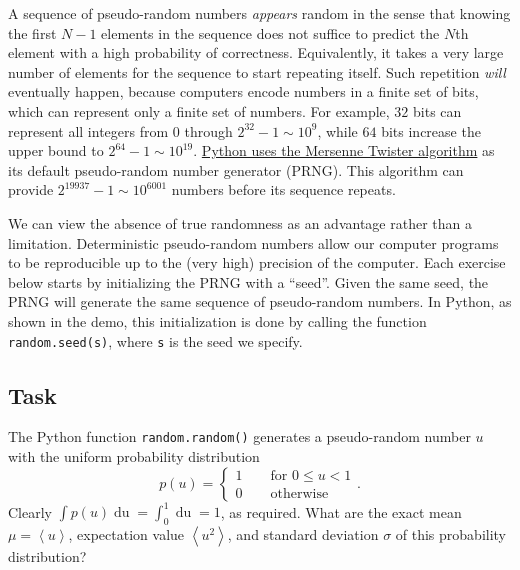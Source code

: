 \documentclass[12 pt]{article} %
\newcommand{\si}{\ensuremath{\sigma} }
\renewcommand{\d}[1]{\ensuremath{\mathop{d#1}} }
\newcommand{\vev}[1]{\ensuremath{\left\langle #1 \right\rangle} }
\newcommand{\showmarks}[1]{\rightline{\texttt{[#1 marks]}}} %
\begin{document}
A sequence of pseudo-random numbers \textit{appears} random in the sense that knowing the first $N - 1$ elements in the sequence does not suffice to predict the $N$th element with a high probability of correctness.
Equivalently, it takes a very large number of elements for the sequence to start repeating itself.
Such repetition \textit{will} eventually happen, because computers encode numbers in a finite set of bits, which can represent only a finite set of numbers.
For example, $32$ bits can represent all integers from $0$ through \href{https://en.wikipedia.org/wiki/4,294,967,295}{$2^{32} - 1 \sim 10^9$}, while $64$ bits increase the upper bound to $2^{64} - 1 \sim 10^{19}$.
\href{https://docs.python.org/3/library/random.html}{Python uses the Mersenne Twister algorithm} as its default pseudo-random number generator (PRNG).
This algorithm can provide $2^{19937} - 1 \sim 10^{6001}$ numbers before its sequence repeats.

We can view the absence of true randomness as an advantage rather than a limitation.
Deterministic pseudo-random numbers allow our computer programs to be reproducible up to the (very high) precision of the computer.
Each exercise below starts by initializing the PRNG with a ``seed''.
Given the same seed, the PRNG will generate the same sequence of pseudo-random numbers.
In Python, as shown in the demo, this initialization is done by calling the function \texttt{random.seed(s)}, where \texttt{s} is the seed we specify.

\newpage %
\subsection*{Task}
The Python function \texttt{random.random()} generates a pseudo-random number $u$ with the uniform probability distribution
\begin{equation}
  \label{eq:uniform}
  p(u) = \left\{\begin{array}{l}1 \qquad \mbox{for } 0 \leq u < 1 \\
                                0 \qquad \mbox{otherwise}\end{array}\right. .
\end{equation}
Clearly $\int p(u) \d{u }= \int_0^1 \d{u} = 1$, as required.
What are the exact mean $\mu = \vev{u}$, expectation value $\vev{u^2}$, and standard deviation \si of this probability distribution?

\showmarks{3}
\end{document}
